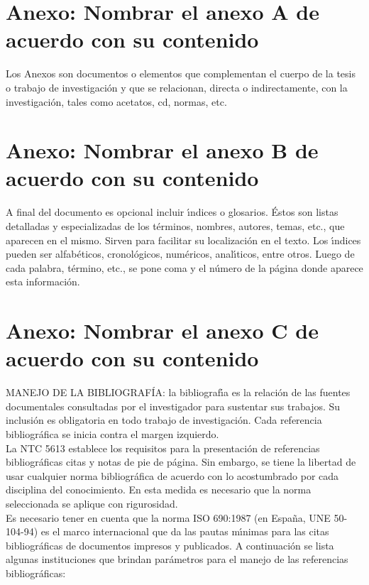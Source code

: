\begin{appendix}
\chapter{Anexo: Nombrar el anexo A de acuerdo con su contenido}\label{AnexoA}
Los Anexos son documentos o elementos que complementan el cuerpo de la tesis o trabajo de investigaci\'{o}n y que se relacionan, directa o indirectamente, con la investigaci\'{o}n, tales como acetatos, cd, normas, etc.\\

\chapter{Anexo: Nombrar el anexo B de acuerdo con su contenido}
A final del documento es opcional incluir \'{\i}ndices o glosarios. \'{E}stos son listas detalladas y especializadas de los t\'{e}rminos, nombres, autores, temas, etc., que aparecen en el mismo. Sirven para facilitar su localizaci\'{o}n en el texto. Los \'{\i}ndices pueden ser alfab\'{e}ticos, cronol\'{o}gicos, num\'{e}ricos, anal\'{\i}ticos, entre otros. Luego de cada palabra, t\'{e}rmino, etc., se pone coma y el n\'{u}mero de la p\'{a}gina donde aparece esta informaci\'{o}n.\\

\chapter{Anexo: Nombrar el anexo C de acuerdo con su contenido}
MANEJO DE LA BIBLIOGRAF\'{I}A: la bibliograf\'{\i}a es la relaci\'{o}n de las fuentes documentales consultadas por el investigador para sustentar sus trabajos. Su inclusi\'{o}n es obligatoria en todo trabajo de investigaci\'{o}n. Cada referencia bibliogr\'{a}fica se inicia contra el margen izquierdo.\\

La NTC 5613 establece los requisitos para la presentaci\'{o}n de referencias bibliogr\'{a}ficas citas y notas de pie de p\'{a}gina. Sin embargo, se tiene la libertad de usar cualquier norma bibliogr\'{a}fica de acuerdo con lo acostumbrado por cada disciplina del conocimiento. En esta medida es necesario que la norma seleccionada se aplique con rigurosidad.\\

Es necesario tener en cuenta que la norma ISO 690:1987 (en Espa\~{n}a, UNE 50-104-94) es el marco internacional que da las pautas m\'{\i}nimas para las citas bibliogr\'{a}ficas de documentos impresos y publicados. A continuaci\'{o}n se lista algunas instituciones que brindan par\'{a}metros para el manejo de las referencias bibliogr\'{a}ficas:\\


\end{appendix}
